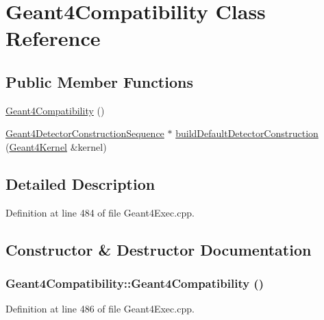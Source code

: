 \hypertarget{class_geant4_compatibility}{
\section{Geant4Compatibility Class Reference}
\label{class_geant4_compatibility}
}
\subsection*{Public Member Functions}
\begin{DoxyCompactItemize}
\item 
\hyperlink{class_geant4_compatibility_a8dc4d9bd93a45cb3524b317ba8cdbc8e}{Geant4Compatibility} ()
\item 
\hyperlink{class_d_d4hep_1_1_simulation_1_1_geant4_detector_construction_sequence}{Geant4DetectorConstructionSequence} $\ast$ \hyperlink{class_geant4_compatibility_abe1c52fe3962756ab59bc3cdde7edca2}{buildDefaultDetectorConstruction} (\hyperlink{class_d_d4hep_1_1_simulation_1_1_geant4_kernel}{Geant4Kernel} \&kernel)
\end{DoxyCompactItemize}


\subsection{Detailed Description}


Definition at line 484 of file Geant4Exec.cpp.

\subsection{Constructor \& Destructor Documentation}
\hypertarget{class_geant4_compatibility_a8dc4d9bd93a45cb3524b317ba8cdbc8e}{
\subsubsection[{Geant4Compatibility}]{\setlength{\rightskip}{0pt plus 5cm}Geant4Compatibility::Geant4Compatibility ()}}
\label{class_geant4_compatibility_a8dc4d9bd93a45cb3524b317ba8cdbc8e}


Definition at line 486 of file Geant4Exec.cpp.

